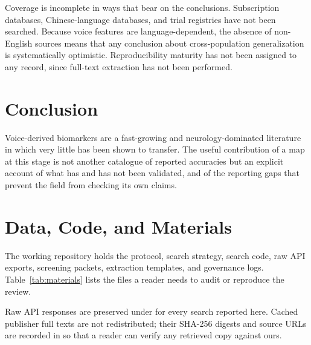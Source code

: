 \documentclass[11pt]{article}
\begin{document}
Coverage is incomplete in ways that bear on the conclusions. Subscription
databases, Chinese-language databases, and trial registries have not been
searched. Because voice features are language-dependent, the absence of
non-English sources means that any conclusion about cross-population
generalization is systematically optimistic. Reproducibility maturity has not
been assigned to any record, since full-text extraction has not been performed.

\section{Conclusion}

Voice-derived biomarkers are a fast-growing and neurology-dominated literature
in which very little has been shown to transfer. The useful contribution of a
map at this stage is not another catalogue of reported accuracies but an
explicit account of what has and has not been validated, and of the reporting
gaps that prevent the field from checking its own claims.

\section{Data, Code, and Materials}

The working repository holds the protocol, search strategy, search code, raw API exports, screening packets, extraction templates, and governance logs. Table~\ref{tab:materials} lists the files a reader needs to audit or reproduce the review.

Raw API responses are preserved under  for every search reported here. Cached publisher full texts are not redistributed; their SHA-256 digests and source URLs are recorded in  so that a reader can verify any retrieved copy against ours.
\end{document}
